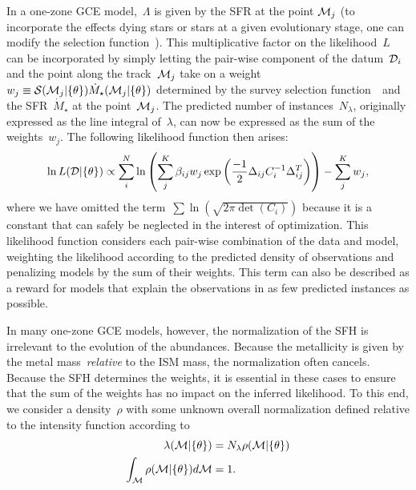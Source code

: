 In a one-zone GCE model,~$\Lambda$ is given by the SFR at the point
$\mathcal{M}_j$ (to incorporate the effects dying stars or stars at a given
evolutionary stage, one can modify the selection function~).
This multiplicative factor on the likelihood~$L$ can be incorporated by simply
letting the pair-wise component of the datum~$\mathcal{D}_i$ and the point along
the track~$\mathcal{M}_j$ take on a weight
$w_j \equiv \mathcal{S}(\mathcal{M}_j | \{\theta\}) \dot{M}_\star(\mathcal{M}_j |
\{\theta\})$ determined by the survey selection function~~and the
SFR~$\dot{M}_\star$ at the point~$\mathcal{M}_j$.
The predicted number of instances~$N_\lambda$, originally expressed as the
line integral of~$\lambda$, can now be expressed as the sum of the
weights~$w_j$.
The following likelihood function then arises:
\begin{equation}
\ln L(\mathcal{D} | \{\theta\}) \propto
\sum_i^N \ln \left(\sum_j^K
\beta_{ij} w_j \exp\left(\frac{-1}{2}\Delta_{ij} C_i^{-1} \Delta_{ij}^T\right)
\right) - \sum_j^K w_j,
\label{dga:eq:lnL_minus_weights}
\end{equation}
where we have omitted the term~$\sum \ln \left(\sqrt{2\pi \det{(C_i)}}\right)$
because it is a constant that can safely be neglected in the interest of
optimization.
This likelihood function considers each pair-wise combination of the data and
model, weighting the likelihood according to the predicted density of
observations and penalizing models by the sum of their weights.
This term can also be described as a reward for models that explain the
observations in as few predicted instances as possible.
\par
In many one-zone GCE models, however, the normalization of the SFH is
irrelevant to the evolution of the abundances.
Because the metallicity is given by the metal mass~\textit{relative} to the ISM
mass, the normalization often cancels.
Because the SFH determines the weights, it is essential in these cases to
ensure that the sum of the weights has no impact on the inferred likelihood.
To this end, we consider a density~$\rho$ with some unknown overall
normalization defined relative to the intensity function according to
\begin{subequations}\begin{align}
\lambda(\mathcal{M} | \{\theta\}) &= N_\lambda \rho(\mathcal{M} | \{\theta\})
\\
\int_{\mathcal{M}} \rho(\mathcal{M} | \{\theta\}) d\mathcal{M} &= 1.
\end{align}\end{subequations}
